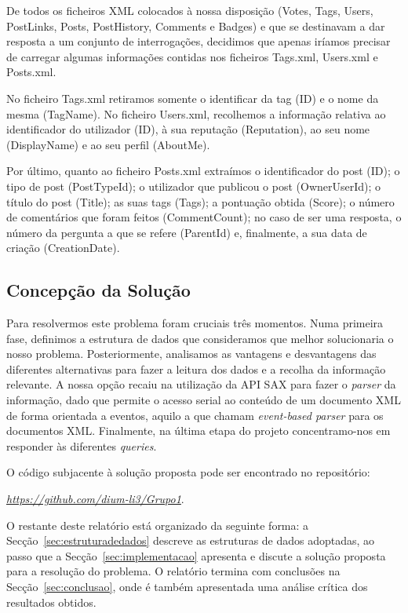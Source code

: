 \documentclass[a4paper]{article}
\begin{document}
De todos os ficheiros XML colocados à nossa disposição (Votes, Tags, Users,
PostLinks, Posts, PostHistory, Comments e Badges) e que se destinavam a dar resposta
a um conjunto de interrogações, decidimos que apenas iríamos precisar de carregar
algumas informações contidas nos ficheiros Tags.xml, Users.xml e Posts.xml. \par
No ficheiro Tags.xml retiramos somente o identificar da tag (ID) e o nome da mesma
(TagName). No ficheiro Users.xml, recolhemos a informação relativa ao identificador
do utilizador (ID), à sua reputação (Reputation), ao seu nome (DisplayName) e ao seu
perfil (AboutMe). \par
Por último, quanto ao ficheiro Posts.xml extraímos o identificador
do post (ID); o tipo de post (PostTypeId); o utilizador que publicou o post
(OwnerUserId); o título do post (Title); as suas tags (Tags); a pontuação obtida
(Score); o número de comentários que foram feitos (CommentCount); no caso de
ser uma resposta, o número da pergunta a que se refere (ParentId) e, finalmente,
a sua data de criação (CreationDate).

\subsection{Concepção da Solução}
\label{sec:solucao}

Para resolvermos este problema foram cruciais três momentos. Numa primeira fase,
definimos a estrutura de dados que consideramos que melhor solucionaria o nosso
problema. Posteriormente, analisamos as vantagens e desvantagens das diferentes
alternativas para fazer a leitura dos dados e a recolha da informação relevante.
A nossa opção recaiu na utilização da API SAX para fazer o \textit{parser} da
informação, dado que permite o acesso serial ao conteúdo de um documento XML de
forma orientada a eventos, aquilo a que chamam \textit{event-based parser} para
os documentos XML.
Finalmente, na última etapa do projeto concentramo-nos em responder
às diferentes \textit{queries}.

O código subjacente à solução proposta pode ser encontrado no repositório:

\begin{center}
\href{https://github.com/dium-li3/Grupo1}{\emph{https://github.com/dium-li3/Grupo1}}.
\end{center}

O restante deste relatório está organizado da seguinte forma: a
Secção~\ref{sec:estruturadedados} descreve as estruturas de dados adoptadas,
ao passo que a Secção~\ref{sec:implementacao}  apresenta e discute a solução
proposta para a resolução do problema. O relatório termina com conclusões na
Secção~\ref{sec:conclusao}, onde é também apresentada uma análise crítica dos
resultados obtidos.
\end{document}

